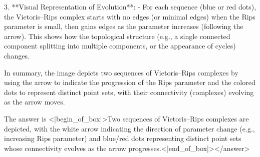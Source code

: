 3. **Visual Representation of Evolution**:  
   - For each sequence (blue or red dots), the Vietoris–Rips complex starts with no edges (or minimal edges) when the Rips parameter is small, then gains edges as the parameter increases (following the arrow). This shows how the topological structure (e.g., a single connected component splitting into multiple components, or the appearance of cycles) changes.  

In summary, the image depicts two sequences of Vietoris–Rips complexes by using the arrow to indicate the progression of the Rips parameter and the colored dots to represent distinct point sets, with their connectivity (complexes) evolving as the arrow moves.  

The answer is <|begin_of_box|>Two sequences of Vietoris–Rips complexes are depicted, with the white arrow indicating the direction of parameter change (e.g., increasing Rips parameter) and blue/red dots representing distinct point sets whose connectivity evolves as the arrow progresses.<|end_of_box|></answer>